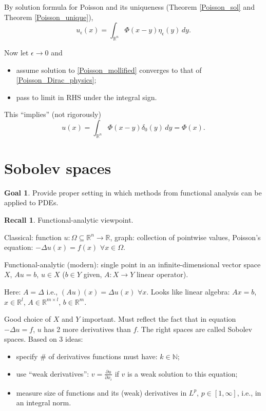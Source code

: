 \documentclass[12pt]{article}
\theoremstyle{definition}
\newtheorem*{recall}{Recall}
\newtheorem*{goal}{Goal}
\begin{document}
By solution formula for Poisson and its uniqueness (Theorem \ref{Poisson_sol} and Theorem \ref{Poisson_unique}),
\[u_{\epsilon}(x)=\int_{\mathbb{R}^n}\Phi(x-y)\eta_{\epsilon}(y)\,dy.\]

Now let $\epsilon\to0$ and
\begin{itemize}
\item assume solution to \eqref{Poisson_mollified} converges to that of \eqref{Poisson_Dirac_physics};
\item pass to limit in RHS under the integral sign.
\end{itemize}
This ``implies'' (not rigorously)
\[u(x)=\int_{\mathbb{R}^n}\Phi(x-y)\delta_0(y)\,dy=\Phi(x).\]

\section{Sobolev spaces}\label{Sobolev_spaces}
\begin{goal}
Provide proper setting in which methods from functional analysis can be applied to PDEs.
\end{goal}

\begin{recall}
Functional-analytic viewpoint.

Classical: function $u:\Omega\subseteq\mathbb{R}^n\rightarrow\mathbb{R}$, graph: collection of pointwise values, Poisson's equation: $-\Delta u(x)=f(x)$ $\forall x\in\Omega$.

Functional-analytic (modern): single point in an infinite-dimensional vector space $X$, $Au=b$, $u\in X$ ($b\in Y$ given, $A:X\rightarrow Y$ linear operator).
\end{recall}

Here: $A=\Delta$ i.e., $(Au)(x)=\Delta u(x)$ $\forall x$. Looks like linear algebra: $Ax=b$, $x\in\mathbb{R}^l$, $A\in\mathbb{R}^{m\times l}$, $b\in\mathbb{R}^m$.

Good choice of $X$ and $Y$ important. Must reflect the fact that in equation $-\Delta u=f$, $u$ has 2 more derivatives than $f$. The right spaces are called Sobolev spaces. Based on 3 ideas:
\begin{itemize}
\item specify \# of derivatives functions must have: $k\in\mathbb{N}$;
\item use ``weak derivatives'': $v=\frac{\partial u}{\partial x_i}$ if $v$ is a weak solution to this equation;
\item measure size of functions and its (weak) derivatives in $L^p$, $p\in[1,\infty]$, i.e., in an integral norm.
\end{itemize}
\end{document}
